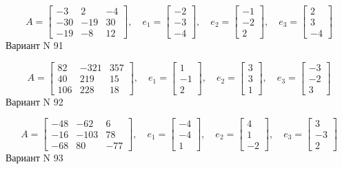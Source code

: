 \documentclass[11pt]{report}
\begin{document}
$$A = \left[\begin{matrix}-3 & 2 & -4\\-30 & -19 & 30\\-19 & -8 & 12\end{matrix}\right],\quad e_1 = \left[\begin{matrix}-2\\-3\\-4\end{matrix}\right],\quad e_2 = \left[\begin{matrix}-1\\-2\\2\end{matrix}\right],\quad e_3 = \left[\begin{matrix}2\\3\\-4\end{matrix}\right]$$Вариант N 91

$$A = \left[\begin{matrix}82 & -321 & 357\\40 & 219 & 15\\106 & 228 & 18\end{matrix}\right],\quad e_1 = \left[\begin{matrix}1\\-1\\2\end{matrix}\right],\quad e_2 = \left[\begin{matrix}3\\3\\1\end{matrix}\right],\quad e_3 = \left[\begin{matrix}-3\\-2\\3\end{matrix}\right]$$Вариант N 92

$$A = \left[\begin{matrix}-48 & -62 & 6\\-16 & -103 & 78\\-68 & 80 & -77\end{matrix}\right],\quad e_1 = \left[\begin{matrix}-4\\-4\\1\end{matrix}\right],\quad e_2 = \left[\begin{matrix}4\\1\\-2\end{matrix}\right],\quad e_3 = \left[\begin{matrix}3\\-3\\2\end{matrix}\right]$$Вариант N 93
\end{document}
